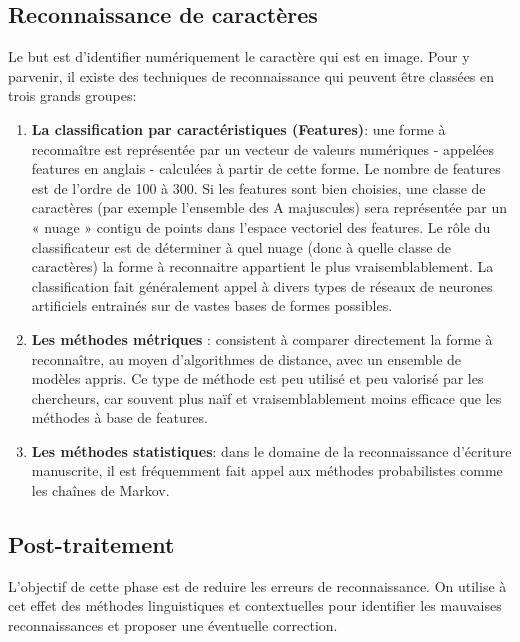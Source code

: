     \subsection{Reconnaissance de caractères}
    Le but est d'identifier numériquement le caractère qui est en image. Pour y parvenir, il existe des techniques de reconnaissance qui peuvent être classées en trois grands groupes:
        \begin{enumerate}
            \item \textbf{La classification par caractéristiques (Features)}: une forme à reconnaître est représentée par un vecteur de valeurs numériques - appelées features en anglais - calculées à partir de cette forme. Le nombre de features est de l'ordre de 100 à 300. Si les features sont bien choisies, une classe de caractères (par exemple l'ensemble des A majuscules) sera représentée par un « nuage » contigu de points dans l'espace vectoriel des features. Le rôle du classificateur est de déterminer à quel nuage (donc à quelle classe de caractères) la forme à reconnaitre appartient le plus vraisemblablement. La classification fait généralement appel à divers types de réseaux de neurones artificiels entrainés sur de vastes bases de formes possibles.
            \item \textbf{Les méthodes métriques} : consistent à comparer directement la forme à reconnaître, au moyen d'algorithmes de distance, avec un ensemble de modèles appris. Ce type de méthode est peu utilisé et peu valorisé par les chercheurs, car souvent plus naïf et vraisemblablement moins efficace que les méthodes à base de features.
            \item \textbf{Les méthodes statistiques}: dans le domaine de la reconnaissance d'écriture manuscrite, il est fréquemment fait appel aux méthodes probabilistes comme les chaînes de Markov.\cite{wikiOCR}
        \end{enumerate}

    \subsection{Post-traitement}
    L'objectif de cette phase est de reduire les erreurs de reconnaissance. On utilise à cet effet des méthodes linguistiques et contextuelles pour identifier les mauvaises reconnaissances et proposer une éventuelle correction. 